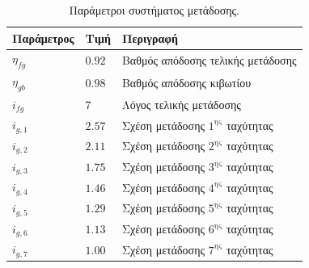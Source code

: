 \begin{table}[htbp]
    \centering
    \small
    \renewcommand{\arraystretch}{1.2}
    \begin{tabular}{@{}l l l@{}}
        \toprule
        \textbf{Παράμετρος} & \textbf{Τιμή} & \textbf{Περιγραφή} \\
        \midrule
        $\eta_{fg}$   & $0.92$   & Βαθμός απόδοσης τελικής μετάδοσης \\
        $\eta_{gb}$   & $0.98$   & Βαθμός απόδοσης κιβωτίου \\
        $i_{fg}$      & $7$      & Λόγος τελικής μετάδοσης \\
        $i_{g,1}$     & $2.57$   & Σχέση μετάδοσης $1^{\text{ης}}$ ταχύτητας \\
        $i_{g,2}$     & $2.11$   & Σχέση μετάδοσης $2^{\text{ης}}$ ταχύτητας \\
        $i_{g,3}$     & $1.75$   & Σχέση μετάδοσης $3^{\text{ης}}$ ταχύτητας \\
        $i_{g,4}$     & $1.46$   & Σχέση μετάδοσης $4^{\text{ης}}$ ταχύτητας \\
        $i_{g,5}$     & $1.29$   & Σχέση μετάδοσης $5^{\text{ης}}$ ταχύτητας \\
        $i_{g,6}$     & $1.13$   & Σχέση μετάδοσης $6^{\text{ης}}$ ταχύτητας \\
        $i_{g,7}$     & $1.00$   & Σχέση μετάδοσης $7^{\text{ης}}$ ταχύτητας \\
        \bottomrule
    \end{tabular}
    \caption{Παράμετροι συστήματος μετάδοσης.}
    \label{tab:params_transmission}
\end{table}



\FloatBarrier